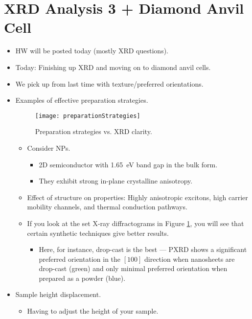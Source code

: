 \documentclass[../notes.tex]{subfiles}
\begin{document}
\section{XRD Analysis 3 + Diamond Anvil Cell}
\begin{itemize}
    \item {}HW will be posted today (mostly XRD questions).
    \item Today: Finishing up XRD and moving on to diamond anvil cells.
    \item We pick up from last time with texture/preferred orientations.
    \item Examples of effective preparation strategies.
    \begin{figure}[h!]
        \centering
        \texttt{[image: preparationStrategies]}
        \caption{Preparation strategies vs. XRD clarity.}
        \label{fig:preparationStrategies}
    \end{figure}
    \begin{itemize}
        \item Consider  NPs.
        \begin{itemize}
            \item 2D semiconductor with \SI{1.65}{\electronvolt} band gap in the bulk form.
            \item They exhibit strong in-plane crystalline anisotropy.
        \end{itemize}
        \item Effect of structure on properties: Highly anisotropic excitons, high carrier mobility channels, and thermal conduction pathways.
        \item If you look at the set X-ray diffractograms in Figure \ref{fig:preparationStrategies}, you will see that certain synthetic techniques give better results.
        \begin{itemize}
            \item Here, for instance, drop-cast is the best --- PXRD shows a significant preferred orientation in the $[100]$ direction when  nanosheets are drop-cast (green) and only minimal preferred orientation when prepared as a powder (blue).
        \end{itemize}
    \end{itemize}
    \item Sample height displacement.
    \begin{itemize}
        \item Having to adjust the height of your sample.

\end{itemize}
\end{itemize}
\end{document}
